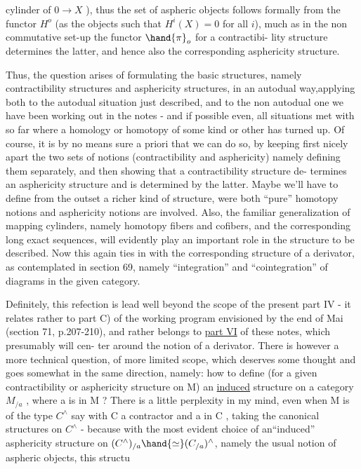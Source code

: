 
cylinder of $0\to X$ ),  thus the  set of aspheric objects follows
formally from the functor $H^{o}$  (as the objects such that $H^{i}(X) = 0$ for all
$i$), much as in the non commutative set-up the functor $\hand{\pi}_{o}$ for a contractibi-%
lity structure determines the latter,  and hence also the corresponding
asphericity structure.

Thus,  the question arises of formulating the basic structures,
namely  contractibility structures and asphericity structures,  in an
autodual way,applying both to the autodual situation just described,  and
to the non autodual one we have been working out in the notes  -  and if
possible even,   all  situations met with so far where a homology
or homotopy  of some kind or other has turned up.  Of course,  it is by no
means sure a priori that we can do so,  by keeping first nicely apart the
two sets of notions (contractibility and asphericity) namely defining
them separately,  and then showing that a contractibility structure de-%
termines an asphericity structure\hand{,} and is determined by the latter.  Maybe
we'll have to define from the outset a richer kind of structure,  were
both ``pure'' homotopy notions and asphericity notions are involved.  Also,
the familiar generalization of mapping cylinders,  namely homotopy
fibers and cofibers,  and the corresponding long exact sequences, will
evidently play an important role in the structure to be described.  Now
this again ties in with the corresponding structure of a derivator,  as
contemplated in section 69,  namely ``integration'' and ``cointegration'' of
diagrams in the given category.

Definitely,  this refection is  lead well beyond the
scope of the present part IV -  it relates rather to part C) of the
working program envisioned by the end of Mai (section 71,  p.207-210),
\margin{$\times$} and rather belongs to \uline{part VI} of these notes,  which presumably will cen-%
ter around the notion of a derivator.  There is  however a more technical
question,  of more limited scope,  which deserves some thought and goes
somewhat in the same direction,  namely:  how to define (for a given
contractibility or asphericity structure on M) an \uline{induced} structure on
a category $M_{/a}$ ,  where a is in M ?   There is a little perplexity in
my mind,  even when M is of the type $C^{\wedge}$ say\hand{,} with C a contractor\hand{,} and a 
in C ,  taking the canonical structures on $C^{\wedge}$ -  because with the most
evident choice of an``induced''  asphericity structure on $(C^{\wedge})_{/a} \hand{\simeq} (C_{/a})^{\wedge}$,
 namely the usual notion of aspheric objects,  this structu

